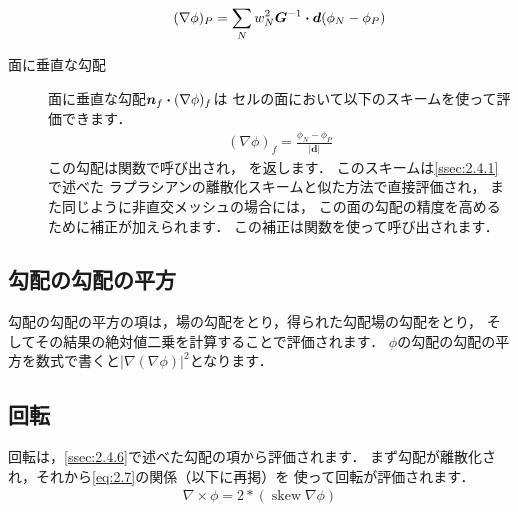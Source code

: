 \begin{description}
            \begin{align}
             \label{eq:2.27}
             (\nabla\phi)_{P}
             = \sum_{N}w_{N}^{2}\bm{G}^{-1} \inProd \bm{d}(\phi_{N} - \phi_{P})
            \end{align}
%
 \item[面に垂直な勾配] 面に垂直な勾配$\bm{n}_{f} \inProd (\nabla\phi)_{f}$は
            セルの面において以下のスキームを使って評価できます．
            \begin{align}
             \label{eq:2.28}
             (\nabla\phi)_{f} = \frac{\phi_{N} - \phi_{P}}{|\bm{d}|}
            \end{align}
            この勾配は関数で呼び出され，
            を返します．
            このスキームは\autoref{ssec:2.4.1}で述べた
            ラプラシアンの離散化スキームと似た方法で直接評価され，
            また同じように非直交メッシュの場合には，
            この面の勾配の精度を高めるために補正が加えられます．
            この補正は関数を使って呼び出されます．
\end{description}


\subsection{勾配の勾配の平方}
\label{ssec:2.4.7}
勾配の勾配の平方の項は，場の勾配をとり，得られた勾配場の勾配をとり，
そしてその結果の絶対値二乗を計算することで評価されます．
$\phi$の勾配の勾配の平方を数式で書くと$|\nabla (\nabla\phi)|^{2}$となります．


\subsection{回転}
\label{ssec:2.4.8}
回転は，\autoref{ssec:2.4.6}で述べた勾配の項から評価されます．
まず勾配が離散化され，それから\autoref{eq:2.7}の関係（以下に再掲）を
使って回転が評価されます．
\begin{align*}
 \nabla \times \phi = 2 \mathop{*} (\mathop{\mathrm{skew}}\nabla\phi)
\end{align*}


